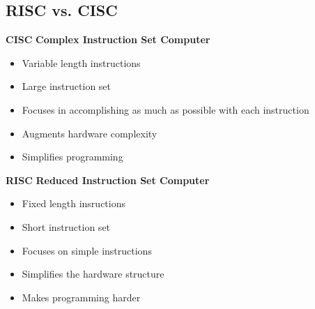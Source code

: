 \subsection{RISC vs. CISC}
\begin{multicols}{2}
    \begin{minipage}{\linewidth}
        \textbf{CISC}\newline
        \textbf{Complex Instruction Set Computer}
        \begin{itemize}
            \item Variable length instructions
            \item Large instruction set
            \item Focuses in accomplishing as much as possible with each instruction
            \item Augments hardware complexity
            \item Simplifies programming
        \end{itemize}    
    \end{minipage}
    \begin{minipage}{\linewidth}
        \textbf{RISC}\newline
        \textbf{Reduced Instruction Set Computer}
        \begin{itemize}
            \item Fixed length insructions
            \item Short instruction set
            \item Focuses on simple instructions
            \item Simplifies the hardware structure
            \item Makes programming harder
          \end{itemize}      
    \end{minipage}
\end{multicols}

